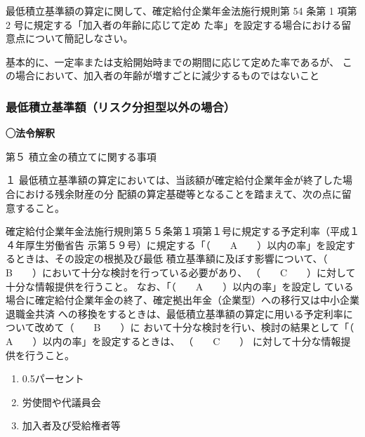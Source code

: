 \begin{shortanswer}[年金2 2019 問題2(1)\textcircled{1}]
  最低積立基準額の算定に関して、確定給付企業年金法施行規則第 54 条第 1 項第 2 号に規定する「加入者の年齢に応じて定め
た率」を設定する場合における留意点について簡記しなさい。
\end{shortanswer}

\begin{answerbox}
  基本的に、一定率または支給開始時までの期間に応じて定めた率であるが、
この場合において、加入者の年齢が増すごとに減少するものではないこと
\end{answerbox}

\newpage

\subsubsection{最低積立基準額（リスク分担型以外の場合）}



\begin{fillblank}[数理人試験 2025 問題1 設問1 E〜G]
  \noindent \textbf{◯法令解釈}
  \begin{lawstructure}
    \begin{lawarticle}{}{}
      \noindent 第５ 積立金の積立てに関する事項

      １ 最低積立基準額の算定においては、当該額が確定給付企業年金が終了した場合における残余財産の分
        配額の算定基礎等となることを踏まえて、次の点に留意すること。
      
      確定給付企業年金法施行規則第５５条第１項第１号に規定する予定利率（平成１４年厚生労働省告
      示第５９号）に規定する「（　　A　　）以内の率」を設定するときは、その設定の根拠及び最低
      積立基準額に及ぼす影響について、（　　B　　）において十分な検討を行っている必要があり、
      （　　C　　）に対して十分な情報提供を行うこと。 なお、「（　　A　　）以内の率」を設定し
      ている場合に確定給付企業年金の終了、確定拠出年金（企業型）への移行又は中小企業退職金共済
      への移換をするときは、最低積立基準額の算定に用いる予定利率について改めて（　　B　　）に
      おいて十分な検討を行い、検討の結果として「（　　A　　）以内の率」を設定するときは、
      （　　C　　） に対して十分な情報提供を行うこと。

    \end{lawarticle}
  \end{lawstructure}
\end{fillblank}

\begin{answerbox}
  \begin{enumerate}[A: ]
    \item 0.5パーセント
    \item 労使間や代議員会
    \item 加入者及び受給権者等
  \end{enumerate}
\end{answerbox}

